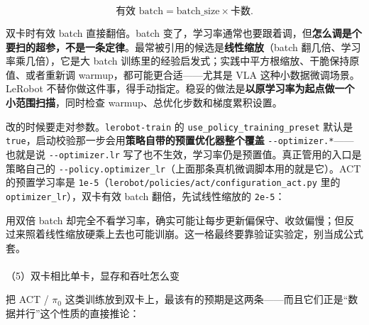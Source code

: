 \documentclass[
  chinese,
]{ctexart}
\makeatletter
\let\oldparagraph\paragraph
\renewcommand{\paragraph}{
    \@ifstar
      \xxxParagraphStar
      \xxxParagraphNoStar
  }
\newcommand{\xxxParagraphStar}[1]{\oldparagraph*{#1}\mbox{}}
\newcommand{\xxxParagraphNoStar}[1]{\oldparagraph{#1}\mbox{}}
\newenvironment{Shaded}{\begin{snugshade}}{\end{snugshade}}
\newcommand{\AttributeTok}[1]{\textcolor[rgb]{0.40,0.45,0.13}{#1}}
\newcommand{\DataTypeTok}[1]{\textcolor[rgb]{0.68,0.00,0.00}{#1}}
\newcommand{\ExtensionTok}[1]{\textcolor[rgb]{0.00,0.23,0.31}{#1}}
\newcommand{\FunctionTok}[1]{\textcolor[rgb]{0.28,0.35,0.67}{#1}}
\newcommand{\NormalTok}[1]{\textcolor[rgb]{0.00,0.23,0.31}{#1}}
\newcommand{\OperatorTok}[1]{\textcolor[rgb]{0.37,0.37,0.37}{#1}}
\newcommand{\VariableTok}[1]{\textcolor[rgb]{0.07,0.07,0.07}{#1}}
\makeatother
\begin{document}
\[
\text{有效 batch} = \text{batch\_size} \times \text{卡数}.
\]

双卡时有效 batch 直接翻倍。batch
变了，学习率通常也要跟着调，但\textbf{怎么调是个要扫的超参，不是一条定律}。最常被引用的候选是\textbf{线性缩放}（batch
翻几倍、学习率乘几倍），它是大 batch
训练里的经验启发式；实践中平方根缩放、干脆保持原值、或者重新调
warmup，都可能更合适------尤其是 VLA 这种小数据微调场景。LeRobot
不替你做这件事，得手动指定。稳妥的做法是\textbf{以原学习率为起点做一个小范围扫描}，同时检查
warmup、总优化步数和梯度累积设置。

改的时候要走对参数。\texttt{lerobot-train} 的
\texttt{use\_policy\_training\_preset} 默认是
\texttt{true}，启动校验那一步会用\textbf{策略自带的预置优化器整个覆盖}
\texttt{-\/-optimizer.*}------也就是说 \texttt{-\/-optimizer.lr}
写了也不生效，学习率仍是预置值。真正管用的入口是策略自己的
\texttt{-\/-policy.optimizer\_lr}（上面那条真机微调脚本用的就是它）。ACT
的预置学习率是
\texttt{1e-5}（\texttt{lerobot/policies/act/configuration\_act.py} 里的
\texttt{optimizer\_lr}），双卡有效 batch 翻倍，先试线性缩放的
\texttt{2e-5}：

\begin{Shaded}
\end{Shaded}

用双倍 batch
却完全不看学习率，确实可能让每步更新偏保守、收敛偏慢；但反过来照着线性缩放硬乘上去也可能训崩。这一格最终要靠验证实验定，别当成公式套。

\paragraph{（5）双卡相比单卡，显存和吞吐怎么变}\label{ux53ccux5361ux76f8ux6bd4ux5355ux5361ux663eux5b58ux548cux541eux5410ux600eux4e48ux53d8}

把 ACT / \(\pi_0\)
这类训练放到双卡上，最该有的预期是这两条------而且它们正是``数据并行''这个性质的直接推论：
\end{document}
